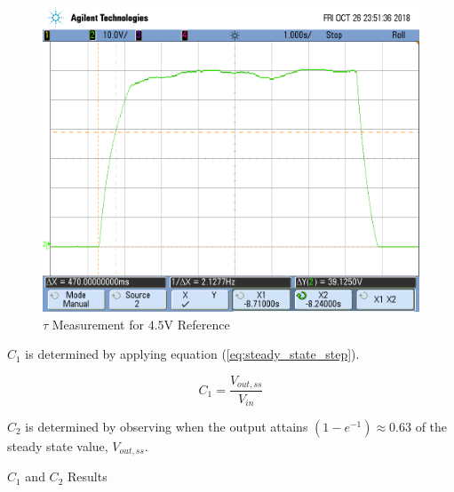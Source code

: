 \FloatBarrier

\FloatBarrier

\begin{figure}[h!]
	\centering
	\includegraphics[scale=0.75]{../images/scope_16.png}
	\caption{$\tau$ Measurement for $4.5$\si{\volt} Reference}
	\label{fig:scope_16}
\end{figure}

\FloatBarrier

$C_1$ is determined by applying equation (\ref{eq:steady_state_step}).

\begin{equation}
	\label{eq:solve_for_steady_state}
	C_1 = \frac{ V_{out,ss} }{ V_{in} }
\end{equation}

$C_2$ is determined by observing when the output attains $(1-e^{-1}) \approx 0.63$ of the steady state value, $V_{out,ss}$.

\FloatBarrier

\begin{table}[h!]
	\centering
	\caption{$C_1$ and $C_2$ Results}
	\label{tab:prob_2}
\end{table}

\FloatBarrier
